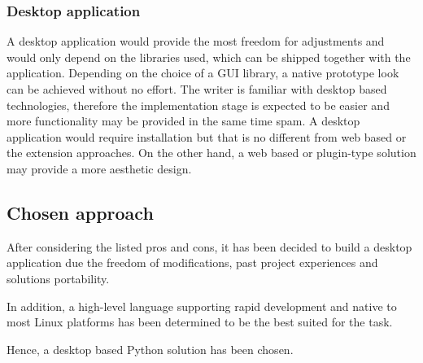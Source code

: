 	\subsubsection{Desktop application}
	A desktop application would provide the most freedom for adjustments and would only depend on the libraries used, which can be shipped together with the application. Depending on the choice of a GUI library, a native prototype look can be achieved without no effort. The writer is familiar with desktop based technologies, therefore the implementation stage is expected to be easier and more functionality may be provided in the same time spam. A desktop application would require installation but that is no different from web based or the extension approaches. On the other hand, a web based or plugin-type solution may provide a more aesthetic design.

\subsection{Chosen approach}
	After considering the listed pros and cons, it has been decided to build a desktop application due the freedom of modifications, past project experiences and solutions portability.
	
	In addition, a high-level language supporting rapid development and native to most Linux platforms has been determined to be the best suited for the task.
	
	Hence, a desktop based Python solution has been chosen.
